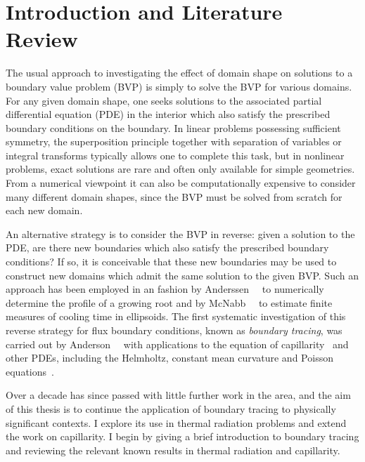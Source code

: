 \chapter{Introduction and Literature Review}
\label{ch:introduction}

The usual approach
to investigating the effect of domain shape
on solutions to a boundary value problem (BVP)
is simply to solve the BVP for various domains.
For any given domain shape, one seeks solutions
to the associated partial differential equation (PDE) in the interior
which also satisfy the prescribed boundary conditions on the boundary.
In linear problems possessing sufficient symmetry,
the superposition principle
together with separation of variables or integral transforms
typically allows one to complete this task,
but in nonlinear problems,
exact solutions are rare and often only available for simple geometries.
From a numerical viewpoint
it can also be computationally expensive
to consider many different domain shapes,
since the BVP must be solved from scratch for each new domain.

An alternative strategy is to
consider the BVP in reverse:
given a solution to the PDE\@, are there new boundaries
which also satisfy the prescribed boundary conditions?
If so, it is conceivable that these new boundaries may be used
to construct new domains
which admit the same solution to the given BVP\@.
Such an approach has been employed in an \adhoc{} fashion
by Anderssen~\etal~\cite{anderssen-1969-ion-uptake-growing-roots}
to numerically determine the profile of a growing root
and by McNabb~\etal~\cite{mcnabb-1991-theoretical-derivation-freezing-times}
to estimate finite measures of cooling time in ellipsoids.
The first systematic investigation of this
reverse strategy for flux boundary conditions,
known as \emph{boundary tracing},
was carried out by
Anderson~\etal~\cite{anderson-2007-boundary-tracing-i-theory}
with applications to the \laplaceyoung{} equation
of capillarity~\cite{anderson-2006-exact-solutions-laplace-young}
and other PDEs, including the Helmholtz,
constant mean curvature and
Poisson equations~\cite{anderson-2007-boundary-tracing-ii-applications}.

Over a decade has since passed
with little further work in the area,
and the aim of this thesis is to
continue the application of boundary tracing
to physically significant contexts.
I explore its use in thermal radiation problems
and extend the work on capillarity.
I begin by giving a brief introduction to boundary tracing
and reviewing the relevant known results
in thermal radiation and capillarity.

